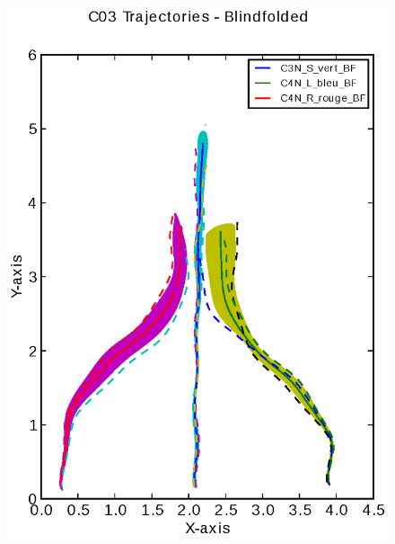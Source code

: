 \documentclass[a4page,landscape,twocolumn,10pt]{article}
\begin{document}
\begin{figure}[!htbp]
  \includegraphics[width=0.4\linewidth]{C03_trajectory_BF.eps}
\end{figure}

\newpage
 
\end{document}

